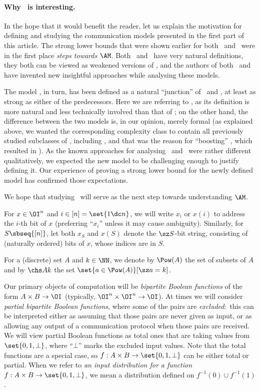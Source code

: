 \paragraph{Why \LAM\ is interesting.}
In the hope that it would benefit the reader, let us explain the motivation for defining and studying the communication models presented in the first part of this %
article.  %
The strong lower bounds that were shown earlier for both \MA\ and \UAM\ were in the first place \emph{steps towards $\AM$}.
Both \MA\ and \UAM\ have very natural definitions, they both can be viewed as weakened versions of \AM, and the authors of both~\cite{K03_Rec} and~\cite{GPW15_Zero} have invented new insightful approaches while analysing these models.

The model \LAM, in turn, has been defined as a natural ``junction'' of \MA\ and \UAM, at least as strong as either of the predecessors.\fn
{
  Here we are referring to \LAM, as its definition is more natural and less technically involved than that of \SLAM; on the other hand, the difference between the two models is, in our opinion, merely formal (as explained above, we wanted the corresponding complexity class to contain all previously studied
%
subclasses of \AM,  %
including \SBP, and that was the reason for ``boosting'' \LAM, which resulted in \SLAM).
}
As the known approaches for analysing \MA\ and \UAM\ were rather different qualitatively, we expected the new model to be challenging enough to justify defining it.
Our experience of proving a strong lower bound for the
%
newly defined   %
model has confirmed those expectations.

We hope that studying \LAM\ will serve as the next step towards understanding $\AM$.


For $x\in\OI^n$ and $i\in{[n]}=\set{1\dc n}$, we will write $x_i$ or $x(i)$ to address the
%
$i$-th bit  %
of $x$ (preferring ``$x_i$'' unless it may cause ambiguity).
Similarly, for $S\sbseq{[n]}$, let both $x_S$ and $x(S)$ denote the $\sz S$-bit string, consisting of %
(naturally ordered)  %
bits of $x$, whose indices are in $S$.

For a (discrete) set $A$ and $k\in\NN$, we denote by $\Pow(A)$ the set of
%
subsets of $A$  %
and by $\chs Ak$ the set $\set{a\in\Pow(A)}[\sz a=k]$.

%
%

Our primary objects of computation will be \emph{bipartite Boolean functions} of the form $A\times B\to\OI$ (typically, $\OI^n\times\OI^n\to\OI$).
At times we will consider \emph{partial bipartite Boolean functions}, where some of the pairs are \emph{excluded}:\ this can be interpreted either as assuming that those pairs are never given as input, or as allowing any output of a communication protocol when those pairs are received.
We will view partial Boolean functions as total ones that are taking values from $\set{0,1,\bot}$, where ``$\bot$'' marks the excluded input values.
Note that the total functions are a special case, so $f:A\times B\to\set{0,1,\bot}$ can be either total or partial.
When we refer to \emph{an input distribution for a function $f:A\times B\to\set{0,1,\bot}$}, we mean a distribution defined on $f^{-1}(0)\cup f^{-1}(1)$.

